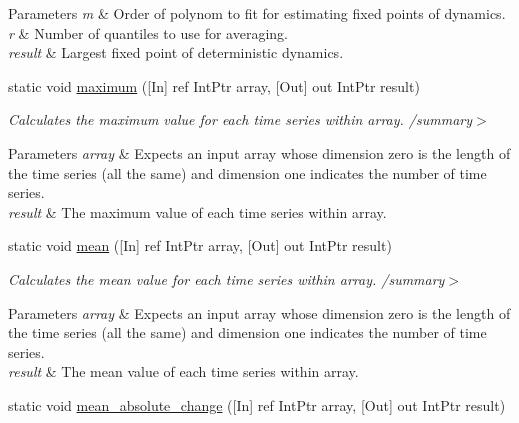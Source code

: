 \begin{DoxyCompactItemize}
\begin{DoxyCompactList}
\begin{DoxyParams}{Parameters}
\hline
{\em m} & Order of polynom to fit for estimating fixed points of dynamics.\\
\hline
{\em r} & Number of quantiles to use for averaging.\\
\hline
{\em result} & Largest fixed point of deterministic dynamics.\\
\hline
\end{DoxyParams}
\end{DoxyCompactList}\item 
static void \mbox{\hyperlink{classkhiva_1_1interop_1_1_d_l_l_features_aac41033b24b4c8001cefc20d365a9cc4}{maximum}} (\mbox{[}In\mbox{]} ref Int\+Ptr array, \mbox{[}Out\mbox{]} out Int\+Ptr result)
\begin{DoxyCompactList}\small\item\em Calculates the maximum value for each time series within array. /summary$>$ 
\begin{DoxyParams}{Parameters}
{\em array} & Expects an input array whose dimension zero is the length of the time series (all the same) and dimension one indicates the number of time series.\\
\hline
{\em result} & The maximum value of each time series within array.\\
\hline
\end{DoxyParams}
\end{DoxyCompactList}\item 
static void \mbox{\hyperlink{classkhiva_1_1interop_1_1_d_l_l_features_a79cdfdec4a4a04bb765842747d6fb955}{mean}} (\mbox{[}In\mbox{]} ref Int\+Ptr array, \mbox{[}Out\mbox{]} out Int\+Ptr result)
\begin{DoxyCompactList}\small\item\em Calculates the mean value for each time series within array. /summary$>$ 
\begin{DoxyParams}{Parameters}
{\em array} & Expects an input array whose dimension zero is the length of the time series (all the same) and dimension one indicates the number of time series.\\
\hline
{\em result} & The mean value of each time series within array.\\
\hline
\end{DoxyParams}
\end{DoxyCompactList}\item 
static void \mbox{\hyperlink{classkhiva_1_1interop_1_1_d_l_l_features_a88f943ce2a238bb143e32f2d4fe632d5}{mean\+\_\+absolute\+\_\+change}} (\mbox{[}In\mbox{]} ref Int\+Ptr array, \mbox{[}Out\mbox{]} out Int\+Ptr result)

\end{DoxyCompactItemize}
